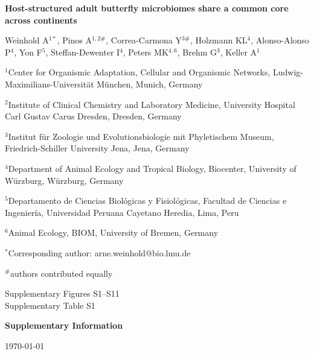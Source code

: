 \documentclass[a4paper,11pt]{scrartcl}
\begin{document}
\begin{titlepage}
	\centering
	{\bfseries\LARGE Host-structured adult butterfly microbiomes share a common core across continents\par}
	\vspace{1.5cm}
	{\large Weinhold A$^{1*}$, Pinos A$^{1,2\#}$, Correa-Carmona Y$^{3\#}$, Holzmann KL$^{4}$, Alonso-Alonso P$^{4}$, Yon F$^{5}$, Steffan-Dewenter I$^{4}$, Peters MK$^{4,6}$, Brehm G$^{3}$, Keller A$^{1}$\par}
	\vspace{0.5cm}
	{\small
		$^{1}$Center for Organismic Adaptation, Cellular and Organismic Networks, Ludwig-Maximilians-Universität München, Munich, Germany\par
		$^{2}$Institute of Clinical Chemistry and Laboratory Medicine, University Hospital Carl Gustav Carus Dresden, Dresden, Germany\par
		$^{3}$Institut für Zoologie und Evolutionsbiologie mit Phyletischem Museum, Friedrich-Schiller University Jena, Jena, Germany\par
		$^{4}$Department of Animal Ecology and Tropical Biology, Biocenter, University of Würzburg, Würzburg, Germany\par
        $^{5}$Departamento de Ciencias Biológicas y Fisiológicas, Facultad de Ciencias e Ingeniería, Universidad Peruana Cayetano Heredia, Lima, Peru\par
        $^{6}$Animal Ecology, BIOM, University of Bremen, Germany\par
	}
    \vspace{0.5cm}
    {\small
		$^{*}$Corresponding author: arne.weinhold@bio.lmu.de\par
        $^{\#}$authors contributed equally\par
        }
    \vspace{2cm}
    Supplementary Figures S1--S11 \\
    Supplementary Table S1
    \vfill
	{\Large \textbf{Supplementary Information}\par}
	\vspace{1cm}
	{\small \today\par} %
\end{titlepage}
\end{document}
